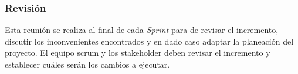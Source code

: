     
\subsubsection{Revisión}

 Esta reunión se realiza al final de cada {\it Sprint} para de revisar el incremento, discutir los inconvenientes
 encontrados y en dado caso adaptar la planeación del proyecto. El equipo scrum y los stakeholder deben
 revisar el incremento y establecer cuáles serán los cambios a ejecutar.\\

 



    

